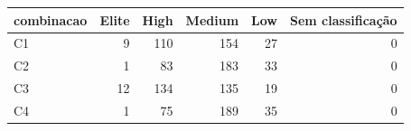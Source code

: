 \begin{tabular}{lrrrrr}
\hline
combinacao & Elite & High & Medium & Low & Sem classificação \\
\hline
C1 & 9 & 110 & 154 & 27 & 0 \\
C2 & 1 & 83 & 183 & 33 & 0 \\
C3 & 12 & 134 & 135 & 19 & 0 \\
C4 & 1 & 75 & 189 & 35 & 0 \\
\hline
\end{tabular}
